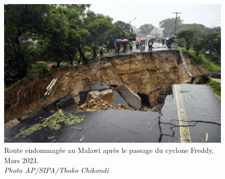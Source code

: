 \documentclass[aspectratio=169, usepdftitle=false, xcolor={dvipsnames}, 9pt,table]{beamer}
\begin{document}
\begin{frame}[c]
\begin{columns}
\begin{column}{0.45\textwidth}
\begin{figure}[h]
                 \centering
                 \includegraphics[width=\textwidth]{Figures/freddy_malawi_route.png}
                 \caption{Route endommagée au Malawi après le passage du cyclone Freddy, Mars 2023.\\\textit{Photo AP/SIPA/Thoko Chikondi}}
             \end{figure}
        \end{column}
    \end{columns}
\end{frame}
\end{document}
